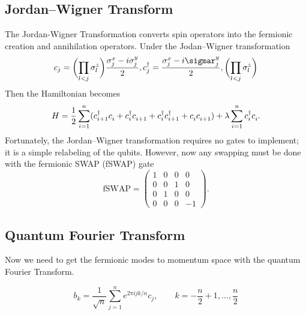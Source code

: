 \documentclass[12pt]{article}
\newcommand*{\eu}{e}
\newcommand*{\iu}{i}
\begin{document}
  \subsection{Jordan--Wigner Transform}
  The Jordan-Wigner Transformation converts spin operators into the fermionic creation and annihilation operators.
  Under the Jodan--Wigner transformation
  \begin{equation}
    \label{eq:jordan-wigner}
    c_{j}
      = \biggl( \prod_{l < j} \sigma_{l}^{z} \biggr)
        \frac{\sigma_{j}^{x} - \iu \sigma_{j}^{y}} {2}, 
    c^{\dagger}_{j} = \frac{\sigma^{x}_{j}-\iu \sigmar^{y}_{j}}    
        {2}, \biggl( \prod_{l < j} \sigma^{z}_{l} \biggr)
  \end{equation}
  Then the Hamiltonian becomes
  \begin{equation}
    \label{eq:hamiltonian-fermion}
    H = \frac{1}{2}
        \sum_{i = 1}^{n} (c_{i + 1}^{\dagger} c_{i}^{\vphantom{\dagger}}
                          + c_{i}^{\dagger} c_{i + 1}^{\vphantom{\dagger}}
                          + c_{i}^{\dagger} c_{i + 1}^{\dagger}
                          + c_{i}^{\vphantom{\dagger}}
                            c_{i + 1}^{\vphantom{\dagger}})
        + \lambda \sum_{i = 1}^{n} c_{i}^{\dagger} c_{i}^{\vphantom{\dagger}}.
  \end{equation}
  Fortunately, the Jordan--Wigner transformation requires no gates to implement; it is a simple relabeling of the qubits. However, now any swapping must be done with the fermionic SWAP (fSWAP) gate
  \begin{equation}
    \label{eq:fswap}
    \mathrm{fSWAP}
      = \begin{pmatrix}
          1 & 0 & 0 & 0 \\
          0 & 0 & 1 & 0 \\
          0 & 1 & 0 & 0 \\
          0 & 0 & 0 & -1
        \end{pmatrix}.
  \end{equation}

  \subsection{Quantum Fourier Transform}
  Now we need to get the fermionic modes to momentum space with the quantum Fourier Transform.

  \begin{equation}
    \label{eq:qft}
    b_{k}
      = \frac{1}{\sqrt{n}}
        \sum_{j = 1}^{n} \eu^{2 \pi \iu j k / n} c_{j}, \qquad
    k = -\frac{n}{2} + 1, \dotsc, \frac{n}{2}
  \end{equation}
\end{document}

